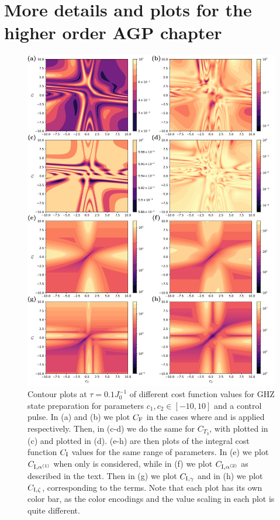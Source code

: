 \chapter{More details and plots for the higher order AGP chapter}\label{app:higher_order_AGP}

\begin{figure}[t]
    \centering
    \includegraphics[width=0.8\linewidth]{images/ghz_contour_maximums.png} \caption[Contour plots of cost function landscapes for GHZ state preparation in frustrated spin systems (maximum amplitude cost function).]{Contour plots at $\tau = 0.1 J_0^{-1}$ of different cost function values for GHZ state preparation for parameters $c_1, c_2 \in [-10,10]$ and a  control pulse. In (a) and (b) we plot $C_{\rm F}$ in the cases where  and   is applied respectively. Then, in (c-d) we do the same for $C_{T_3}$, with   plotted in (c) and   plotted in (d). (e-h) are then plots of the integral cost function $C_{\rm I}$ values for the same range of parameters. In (e) we plot $C_{\rm I, \alpha^{(1)}}$ when only   is considered, while in (f) we plot $C_{\rm I, \alpha^{(2)}}$ as described in the text. Then in (g) we plot $C_{\rm I, \gamma}$ and in (h) we plot $C_{\rm I, \zeta}$, corresponding to the  terms. Note that each plot has its own color bar, as the color encodings and the value scaling in each plot is quite different.}\label{fig:ghz_contours_max_appendix}
\end{figure}

